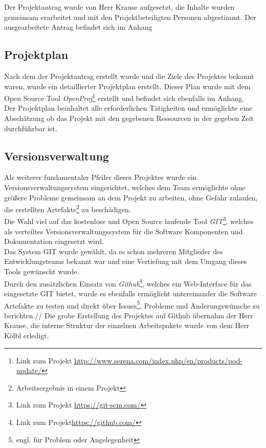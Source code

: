 Der Projektantrag wurde von Herr Krause aufgesetzt, die Inhalte wurden gemeinsam erarbeitet und mit den Projektbeteiligten Personen abgestimmt. Der ausgearbeitete Antrag befindet sich im Anhang

\subsection{Projektplan}
Nach dem der Projektantrag erstellt wurde und die Ziele des Projektes bekannt waren, wurde ein detaillierter Projektplan erstellt. Dieser Plan wurde mit dem Open Source Tool \textit{OpenProj}\footnote{Link zum Projekt \url{http://www.serena.com/index.php/en/products/pod-update/}} erstellt und befindet sich ebenfalls im Anhang.\\
Der Projektplan beinhaltet alle erforderlichen Tätigkeiten und ermöglichte eine Abschätzung ob das Projekt mit den gegebenen Ressourcen in der gegeben Zeit durchführbar ist.

\subsection{Versionsverwaltung}
Als weiterer fundamentaler Pfeiler dieses Projektes wurde ein Versionsverwaltungssystem eingerichtet, welches dem Team ermöglichte ohne größere Probleme gemeinsam an dem Projekt zu arbeiten, ohne Gefahr zulaufen, die erstellten Artefakte\footnote{Arbeitsergebnis in einem Projekt} zu beschädigen.\\
Die Wahl viel auf das kostenlose und Open Source laufende Tool \textit{GIT}\footnote{Link zum Projekt \url{https://git-scm.com/}}, welches als verteiltes Versionsverwaltungssystem für die Software Komponenten und Dokumentation eingesetzt wird.\\
Das System GIT wurde gewählt, da es schon mehreren Mitglieder des Entwicklungsteams bekannt war und eine Vertiefung mit dem Umgang dieses Tools gewünscht wurde.\\
Durch den zusätzlichen Einsatz von \textit{Github}\footnote{Link zum Projekt\url{https://github.com/}}, welches ein Web-Interface für das eingesetzte GIT bietet, wurde es ebenfalls ermöglicht untereinander die Software Artefakte zu testen und direkt über Issues\footnote{engl. für Problem oder Angelegenheit}, Probleme und Änderungswünsche zu berichten.//
Die grobe Erstellung des Projektes auf Github übernahm der Herr Krause, die interne Struktur der einzelnen Arbeitspakete wurde von dem Herr Kölbl erledigt. 


